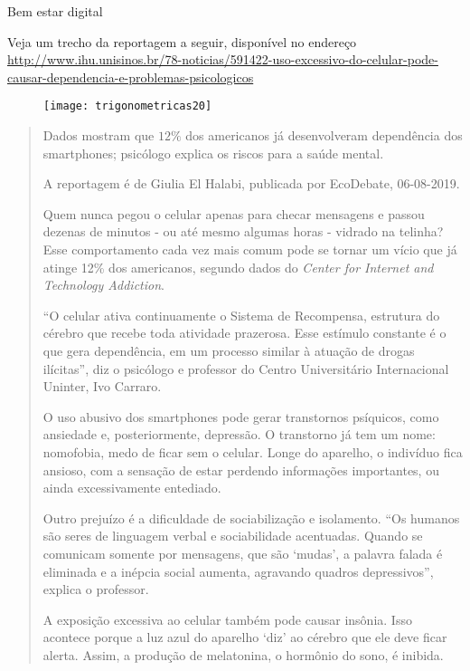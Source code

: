 \clearpage
\begin{task}{Bem estar digital}
\label{trig-ativ6}


Veja um trecho da reportagem a seguir, disponível no endereço \url{http://www.ihu.unisinos.br/78-noticias/591422-uso-excessivo-do-celular-pode-causar-dependencia-e-problemas-psicologicos}


\begin{figure}[H]
\centering

\texttt{[image: trigonometricas20]}

\end{figure}

\begin{quote}

Dados mostram que $12\%$ dos americanos já desenvolveram dependência dos smartphones; psicólogo explica os riscos para a saúde mental.

A reportagem é de Giulia El Halabi, publicada por EcoDebate, 06-08-2019.


Quem nunca pegou o celular apenas para checar mensagens e passou dezenas de minutos - ou até mesmo algumas horas - vidrado na telinha? Esse comportamento cada vez mais comum pode se tornar um vício que já atinge 12\% dos americanos, segundo dados do \textit{Center for Internet and Technology Addiction}.

“O celular ativa continuamente o Sistema de Recompensa, estrutura do cérebro que recebe toda atividade prazerosa. Esse estímulo constante é o que gera dependência, em um processo similar à atuação de drogas ilícitas”, diz o psicólogo e professor do Centro Universitário Internacional Uninter, Ivo Carraro.

O uso abusivo dos smartphones pode gerar transtornos psíquicos, como ansiedade e, posteriormente, depressão. O transtorno já tem um nome: nomofobia, medo de ficar sem o celular. Longe do aparelho, o indivíduo fica ansioso, com a sensação de estar perdendo informações importantes, ou ainda excessivamente entediado.

Outro prejuízo é a dificuldade de sociabilização e isolamento. “Os humanos são seres de linguagem verbal e sociabilidade acentuadas. Quando se comunicam somente por mensagens, que são ‘mudas’, a palavra falada é eliminada e a inépcia social aumenta, agravando quadros depressivos”, explica o professor.

A exposição excessiva ao celular também pode causar insônia. Isso acontece porque a luz azul do aparelho ‘diz’ ao cérebro que ele deve ficar alerta. Assim, a produção de melatonina, o hormônio do sono, é inibida.


\end{quote}
\end{task}
